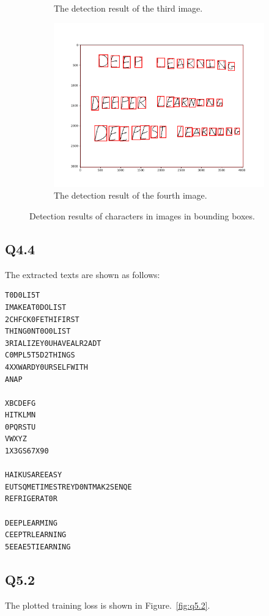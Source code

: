 \documentclass[11pt]{article}
\begin{document}
\begin{figure}[h!]
\begin{subfigure}{.495\textwidth}
      \caption{The detection result of the third image. }
    \end{subfigure}
    \begin{subfigure}{.495\textwidth}
      \centering
      \includegraphics[width=.9\linewidth]{../results/q4_3_4.png}
      \caption{The detection result of the fourth image. }
    \end{subfigure}\hfill
    \caption{Detection results of characters in images in bounding boxes. }
    \label{fig:q4.3}
\end{figure}

\newpage
\subsection*{Q4.4}

The extracted texts are shown as follows:

\begin{verbatim}
T0D0LI5T
IMAKEAT0DOLIST
2CHFCK0FETHIFIRST
THING0NT0O0LIST
3RIALIZEY0UHAVEALR2ADT
C0MPL5T5D2THINGS
4XXWARDY0URSELFWITH
ANAP

XBCDEFG
HITKLMN
0PQRSTU
VWXYZ
1X3GS67X90

HAIKUSAREEASY
EUTSQMETIMESTREYD0NTMAK2SENQE
REFRIGERAT0R

DEEPLEARMING
CEEPTRLEARNING
5EEAE5TIEARNING
\end{verbatim}

\newpage

\subsection*{Q5.2}

The plotted training loss is shown in Figure.~\ref{fig:q5.2}.
\end{document}

